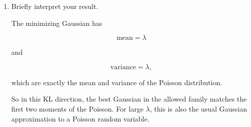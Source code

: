 \documentclass[11pt]{article}
\newcommand{\E}{\mathbb{E}}
\newcommand{\Var}{\operatorname{Var}}
\begin{document}
\begin{enumerate}
because

\[
\E[X-\lambda]=0,
\qquad
\E[(X-\lambda)^2]=\Var(X)=\lambda.
\]

Ignoring constants, the objective is therefore

\[
F(\mu,\sigma)
=
\frac{\lambda+(\lambda-\mu)^2}{2\sigma^2}
+
\frac12\log(2\pi\sigma^2).
\]

Differentiate with respect to \(\mu\):

\[
\frac{\partial F}{\partial\mu}
=
\frac{\mu-\lambda}{\sigma^2}.
\]

Thus

\[
\mu=\lambda.
\]

Now substitute this back in:

\[
F(\lambda,\sigma)
=
\frac{\lambda}{2\sigma^2}
+
\frac12\log(2\pi\sigma^2).
\]

It is a little cleaner to let

\[
v=\sigma^2.
\]

Then

\[
F(v)=\frac{\lambda}{2v}+\frac12\log(2\pi v).
\]

Differentiate:

\[
\frac{dF}{dv}
=
-\frac{\lambda}{2v^2}
+
\frac{1}{2v}.
\]

Set equal to zero:

\[
-\frac{\lambda}{2v^2}
+
\frac{1}{2v}
=0.
\]

Multiply by \(2v^2\):

\[
-\lambda+v=0.
\]

Thus

\[
v=\lambda,
\]

so

\[
\sigma^2=\lambda
\]

and therefore

\[
\sigma=\sqrt{\lambda}.
\]

So the optimal parameters are

\[
\mu^*=\lambda,
\qquad
(\sigma^*)^2=\lambda.
\]

\item Briefly interpret your result.

The minimizing Gaussian has

\[
\text{mean}=\lambda
\]

and

\[
\text{variance}=\lambda,
\]

which are exactly the mean and variance of the Poisson distribution.

So in this KL direction, the best Gaussian in the allowed family matches
the first two moments of the Poisson. For large \(\lambda\), this is also
the usual Gaussian approximation to a Poisson random variable.

\end{enumerate}
\end{document}
